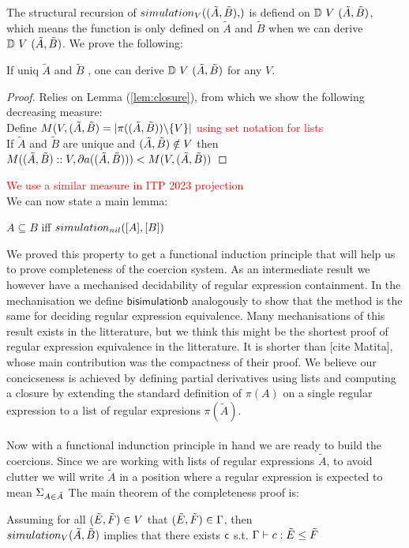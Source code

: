 \documentclass[a4paper,UKenglish,cleveref, autoref, thm-restate]{lipics-v2021}
\newcommand\mycomment[1]{\textcolor{red}{#1}}
\begin{document}
The structural recursion of $\simulationb{V}{\pder{A}{B}}$ is defiend on $\mathbb{D}~{V}~(\tilde{A},\tilde{B})$, which means the function is only defined on $\tilde{A}$ and $\tilde{B}$ when we can derive $\mathbb{D}~{V}~(\tilde{A},\tilde{B})$. We prove the following:
\begin{lemma}
If uniq $\tilde{A}$ and $\tilde{B}$ , one can derive $\mathbb{D}~{V}~(\tilde{A},\tilde{B})$ for any $V$.
\end{lemma}
\begin{proof}
Relies on Lemma (\ref{lem:closure}), from which we show the following decreasing measure:\\
Define $M(V,(\tilde{A},\tilde{B}) = |\pi((\tilde{A},\tilde{B})) \backslash \{V\}|  $ \mycomment{using set notation for lists}\\
If $\tilde{A}$ and $\tilde{B}$ are unique and $(\tilde{A},\tilde{B}) \notin V$ then $M((\tilde{A},\tilde{B})::V,\partial{a}((\tilde{A},\tilde{B}))) <  M(V,(\tilde{A},\tilde{B})) $
\end{proof}
\mycomment{We use a similar measure in ITP 2023 projection}\\
We can now state a main lemma:
\begin{lemma}
$A \subseteq B$ iff $\simulationb{nil}{[A]}{[B]}$
\end{lemma}
We proved this property to get a functional induction principle that will help us to prove completeness of the coercion system. As an intermediate result we however have a mechanised decidability of regular expression containment. In the mechanisation we define $\mathsf{bisimulationb}$ analogously to show that the method is the same for deciding regular expression equivalence. Many mechanisations of this result exists in the litterature, but we think this might be the shortest proof of regular expression equivalence in the litterature. It is shorter than [cite Matita], whose main contribution was the compactness of their proof. We believe our concicseness is achieved by defining partial derivatives using lists and computing a closure by extending the standard definition of $\pi(A)$ on a single regular expression to a list of regular expresions $\pi(\tilde{A})$.\\\\
Now with a functional indunction principle in hand we are ready to build the coercions. Since we are working with lists of regular expressions $\tilde{A}$, to avoid clutter we will write $\tilde{A}$ in a position where a regular expression is expected to mean $\Sigma_{A \in \tilde{A}}$ The main theorem of the completeness proof is:
\begin{theorem}
Assuming for all $(\tilde{E},\tilde{F}) \in V$ that $(\tilde{E},\tilde{F}) \in \Gamma$, then\\
$\simulationb{V}{\tilde{A}}{\tilde{B}}$ implies that there exists $\textsf{c}$ s.t. $\contains{\Gamma}{c}{\tilde{E}}{\tilde{F}}$
\end{theorem}
\end{document}
